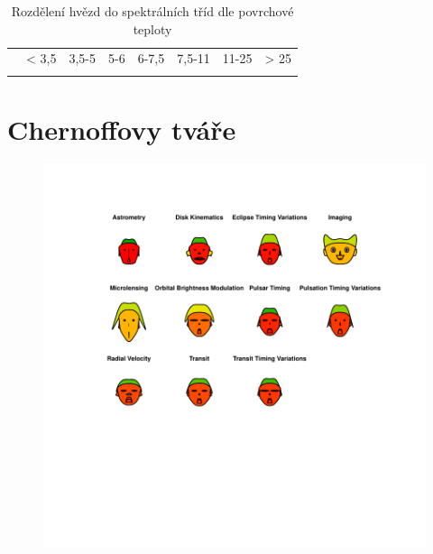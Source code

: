 \documentclass[a4paper,12pt]{article}
\begin{document}
\begin{table}[ht]
\centering
\begin{tabular}{| l| l| l| l| l| l| l| l|}
  \hline
 & {\cellcolor[rgb]{0.85, 0.85, 0.85}{ M }} & {\cellcolor[rgb]{0.85, 0.85, 0.85}{ K }} & {\cellcolor[rgb]{0.85, 0.85, 0.85}{ G }} & {\cellcolor[rgb]{0.85, 0.85, 0.85}{ F }} & {\cellcolor[rgb]{0.85, 0.85, 0.85}{ A }} & {\cellcolor[rgb]{0.85, 0.85, 0.85}{ B }} & {\cellcolor[rgb]{0.85, 0.85, 0.85}{ O }} \\ 
  \hline
{\cellcolor[rgb]{0.85, 0.85, 0.85}{ Teplota [tisíce K] }} & < 3,5 & 3,5-5 & 5-6 & 6-7,5 & 7,5-11 & 11-25 & > 25 \\ 
   \hline
{\cellcolor[rgb]{0.85, 0.85, 0.85}{ Počet }} & {\cellcolor[rgb]{ 0.948453608247423 ,  1 ,  0.948453608247423 }{ 110 }} & {\cellcolor[rgb]{ 0.606841611996251 ,  1 ,  0.606841611996251 }{ 839 }} & {\cellcolor[rgb]{ 0 ,  1 ,  0 }{ 2134 }} & {\cellcolor[rgb]{ 0.642455482661668 ,  1 ,  0.642455482661668 }{ 763 }} & {\cellcolor[rgb]{ 0.992502343017807 ,  1 ,  0.992502343017807 }{ 16 }} & {\cellcolor[rgb]{ 0.999531396438613 ,  1 ,  0.999531396438613 }{ 1 }} & {\cellcolor[rgb]{ 0.995782567947516 ,  1 ,  0.995782567947516 }{ 9 }} \\ 
   \hline
\end{tabular}
\caption{Rozdělení hvězd do spektrálních tříd dle povrchové teploty} 
\end{table}
\newpage

\section{Chernoffovy tváře}
\begin{figure}[!htb]
\vspace{-1in}\hspace{-0.2\textwidth}
\includegraphics[width = 1.4\textwidth]{exoplanety-faces.pdf}
\vspace{-3.25in}
\end{figure}
\end{document}
